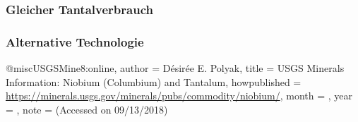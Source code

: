\subsubsection{Gleicher Tantalverbrauch}

\subsubsection{Alternative Technologie}


@misc{USGSMine8:online,
author = {Désirée E. Polyak},
title = {USGS Minerals Information: Niobium (Columbium) and Tantalum},
howpublished = {\url{https://minerals.usgs.gov/minerals/pubs/commodity/niobium/}},
month = {},
year = {},
note = {(Accessed on 09/13/2018)}
}

